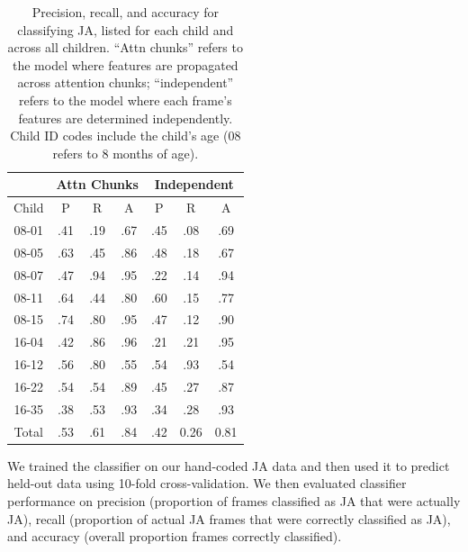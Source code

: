 \documentclass[10pt,letterpaper]{article}
\begin{document}
\begin{table}[t]
\centering
\begin{tabular}{c|ccc|ccc}
 &\multicolumn{3}{c}{Attn Chunks} & \multicolumn{3}{c}{Independent} \\
\hline
Child & P & R & A & P & R & A \\
\hline
08-01 & .41 & .19 & .67 & .45 & .08 & .69\\
08-05 & .63 & .45 & .86 & .48 & .18 & .67  \\
08-07 & .47 & .94 & .95 & .22 & .14 & .94  \\
08-11 & .64 & .44 & .80 & .60 & .15 & .77  \\
08-15 & .74 & .80 & .95 & .47 & .12 & .90 \\
16-04 & .42 & .86 & .96 & .21 & .21 & .95 \\
16-12 & .56 & .80 & .55 & .54 & .93 & .54 \\
16-22 & .54 & .54 & .89 & .45 & .27 & .87  \\
16-35 & .38 & .53 & .93 & .34 & .28 & .93\\
\hline
Total & .53 & .61 & .84 & .42 &  0.26 &  0.81\\

\hline
\end{tabular}
\caption{Precision, recall, and accuracy for classifying JA, listed for each child and across all children. ``Attn chunks'' refers to the model where features are propagated across attention chunks; ``independent'' refers to the model where each frame's features are determined independently. Child ID codes include the child's age (08 refers to 8 months of age).}
\label{tb:Results2}
\end{table}

We trained the classifier on our hand-coded JA data and then used it to predict held-out data using 10-fold cross-validation. We then evaluated classifier performance on precision (proportion of frames classified as JA that were actually JA), recall (proportion of actual JA frames that were correctly classified as JA), and accuracy (overall proportion frames correctly classified). 
\end{document}
